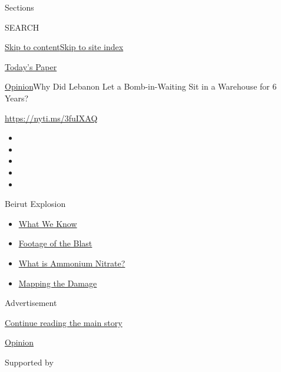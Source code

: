 Sections

SEARCH

\protect\hyperlink{site-content}{Skip to
content}\protect\hyperlink{site-index}{Skip to site index}

\href{https://myaccount.nytimes.com/auth/login?response_type=cookie\&client_id=vi}{}

\href{https://www.nytimes.com/section/todayspaper}{Today's Paper}

\href{/section/opinion}{Opinion}\textbar{}Why Did Lebanon Let a
Bomb-in-Waiting Sit in a Warehouse for 6 Years?

\href{https://nyti.ms/3fuIXAQ}{https://nyti.ms/3fuIXAQ}

\begin{itemize}
\item
\item
\item
\item
\item
\end{itemize}

Beirut Explosion

\begin{itemize}
\tightlist
\item
  \href{https://www.nytimes.com/2020/08/05/world/middleeast/beirut-explosion-what-happened.html?action=click\&pgtype=Article\&state=default\&region=TOP_BANNER\&context=storylines_menu}{What
  We Know}
\item
  \href{https://www.nytimes.com/2020/08/05/video/beirut-explosion-footage.html?action=click\&pgtype=Article\&state=default\&region=TOP_BANNER\&context=storylines_menu}{Footage
  of the Blast}
\item
  \href{https://www.nytimes.com/2020/08/05/world/middleeast/beirut-explosion-ammonium-nitrate.html?action=click\&pgtype=Article\&state=default\&region=TOP_BANNER\&context=storylines_menu}{What
  is Ammonium Nitrate?}
\item
  \href{https://www.nytimes.com/interactive/2020/08/04/world/middleeast/beirut-explosion-damage.html?action=click\&pgtype=Article\&state=default\&region=TOP_BANNER\&context=storylines_menu}{Mapping
  the Damage}
\end{itemize}

Advertisement

\protect\hyperlink{after-top}{Continue reading the main story}

\href{/section/opinion}{Opinion}

Supported by

